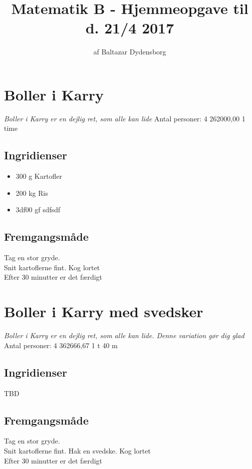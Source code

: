 \documentclass[11pt, a4paper]{article}
\title{Matematik B - Hjemmeopgave til d. 21/4 2017}
\author{af Baltazar Dydensborg}
\begin{document}
\newenvironment{recipe}[7]{
	\section*{#1}
	\textit{#2}
	Antal personer: #3
	#4
	#5
	\subsection*{Ingridienser}
	#6
	\subsection*{Fremgangsmåde}
	#7
}
{\newpage}


\newenvironment{ingredients}{\begin{itemize}
}{	\end{itemize}}

\newcommand{\ingredient}[3]{
	\item #2 #3 #1
}


\begin{recipe}
	{Boller i Karry}
	{Boller i Karry er en dejlig ret, som alle kan lide}
	{4}
	{262000,00}
	{1 time}
	{\begin{ingredients}
			\ingredient{Kartofler}{300}{g}
			\ingredient{Ris}{200}{kg}
			\ingredient{sdfsdf}{3df00}{gf}
			
		\end{ingredients}
			
			}
	{Tag en stor gryde. \\
		Snit kartoflerne fint. Kog lortet\\
		Efter 30 minutter er det færdigt}
\end{recipe}










\begin{recipe}
	{Boller i Karry med svedsker}
	{Boller i Karry er en dejlig ret, som alle kan lide. Denne variation gør dig glad}
	{4}
	{362666,67}
	{1 t 40 m}
	{TBD}
			{Tag en stor gryde. \\
				Snit kartoflerne fint. Hak en svedske. Kog lortet\\
				Efter 30 minutter er det færdigt}
		\end{recipe}

	
\end{document}

